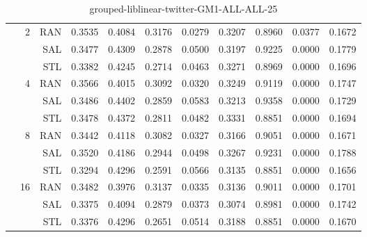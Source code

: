 \begin{center}
\begin{table}[htbp]
\begin{center}
\begin{tabular}{ | r | r | r | r | r | r | r | r | r | r | r |}
 & \multirow{3}{*}{2} & RAN & 0.3535 & 0.4084 & 0.3176 & 0.0279 & 0.3207 & 0.8960 & 0.0377 & 0.1672\\ \cline{3-11}
 &   & SAL & 0.3477 & 0.4309 & 0.2878 & 0.0500 & 0.3197 & 0.9225 & 0.0000 & 0.1779\\ \cline{3-11}
 &   & STL & 0.3382 & 0.4245 & 0.2714 & 0.0463 & 0.3271 & 0.8969 & 0.0000 & 0.1696\\ \cline{2-11}
 & \multirow{3}{*}{4} & RAN & 0.3566 & 0.4015 & 0.3092 & 0.0320 & 0.3249 & 0.9119 & 0.0000 & 0.1747\\ \cline{3-11}
 &   & SAL & 0.3486 & 0.4402 & 0.2859 & 0.0583 & 0.3213 & 0.9358 & 0.0000 & 0.1729\\ \cline{3-11}
 &   & STL & 0.3478 & 0.4372 & 0.2811 & 0.0482 & 0.3331 & 0.8851 & 0.0000 & 0.1694\\ \cline{2-11}
 & \multirow{3}{*}{8} & RAN & 0.3442 & 0.4118 & 0.3082 & 0.0327 & 0.3166 & 0.9051 & 0.0000 & 0.1671\\ \cline{3-11}
 &   & SAL & 0.3520 & 0.4186 & 0.2944 & 0.0498 & 0.3267 & 0.9231 & 0.0000 & 0.1788\\ \cline{3-11}
 &   & STL & 0.3294 & 0.4296 & 0.2591 & 0.0566 & 0.3135 & 0.8851 & 0.0000 & 0.1656\\ \cline{2-11}
 & \multirow{3}{*}{16} & RAN & 0.3482 & 0.3976 & 0.3137 & 0.0335 & 0.3136 & 0.9011 & 0.0000 & 0.1701\\ \cline{3-11}
 &   & SAL & 0.3375 & 0.4094 & 0.2879 & 0.0373 & 0.3074 & 0.8981 & 0.0000 & 0.1742\\ \cline{3-11}
 &   & STL & 0.3376 & 0.4296 & 0.2651 & 0.0514 & 0.3188 & 0.8851 & 0.0000 & 0.1670\\ \cline{2-11}
\hline
\end{tabular}
\caption{grouped-liblinear-twitter-GM1-ALL-ALL-25}
\end{center}
 \end{table}
\end{center}

